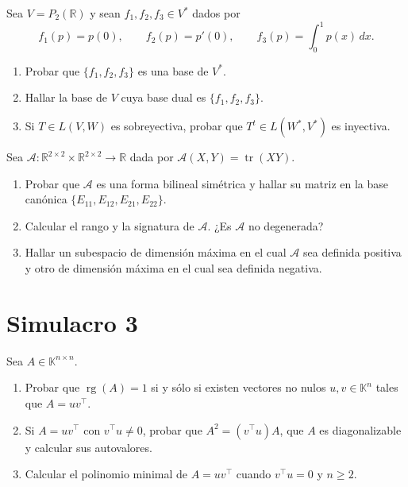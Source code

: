 \documentclass{article}
\newcommand{\R}{\mathbb{R}}
\newcommand{\K}{\mathbb{K}}
\DeclareMathOperator{\rg}{rg}
\DeclareMathOperator{\tr}{tr}
\newcommand{\A}{\mathcal{A}}
\newenvironment{ejercicio}[1]{\begin{trivlist}
\item[\hskip \labelsep {\bfseries #1.}]}{\end{trivlist}}
\begin{document}
\begin{ejercicio}{4}
    Sea \( V = P_2(\R) \) y sean \( f_1, f_2, f_3 \in V^* \) dados por
    \[ f_1(p) = p(0), \qquad f_2(p) = p'(0), \qquad f_3(p) = \int_0^1 p(x) \, dx. \]
    \begin{enumerate}
        \item Probar que \( \{f_1, f_2, f_3\} \) es una base de \( V^* \).
        \item Hallar la base de \( V \) cuya base dual es \( \{f_1, f_2, f_3\} \).
        \item Si \( T \in L(V, W) \) es sobreyectiva, probar que \( T^t \in L(W^*, V^*) \) es inyectiva.
    \end{enumerate}
\end{ejercicio}

\begin{ejercicio}{5}
    Sea \( \A: \R^{2 \times 2} \times \R^{2 \times 2} \to \R \) dada por \( \A(X, Y) = \tr(XY) \).
    \begin{enumerate}
        \item Probar que \( \A \) es una forma bilineal simétrica y hallar su matriz en la base canónica \( \{E_{11}, E_{12}, E_{21}, E_{22}\} \).
        \item Calcular el rango y la signatura de \( \A \). ¿Es \( \A \) no degenerada?
        \item Hallar un subespacio de dimensión máxima en el cual \( \A \) sea definida positiva y otro de dimensión máxima en el cual sea definida negativa.
    \end{enumerate}
\end{ejercicio}

\newpage
\section*{Simulacro 3}

\begin{ejercicio}{1}
    Sea \( A \in \K^{n \times n} \).
    \begin{enumerate}
        \item Probar que \( \rg(A) = 1 \) si y sólo si existen vectores no nulos \( u, v \in \K^n \) tales que \( A = uv^\top \).
        \item Si \( A = uv^\top \) con \( v^\top u \neq 0 \), probar que \( A^2 = (v^\top u) A \), que \( A \) es diagonalizable y calcular sus autovalores.
        \item Calcular el polinomio minimal de \( A = uv^\top \) cuando \( v^\top u = 0 \) y \( n \ge 2 \).
    \end{enumerate}
\end{ejercicio}
\end{document}

